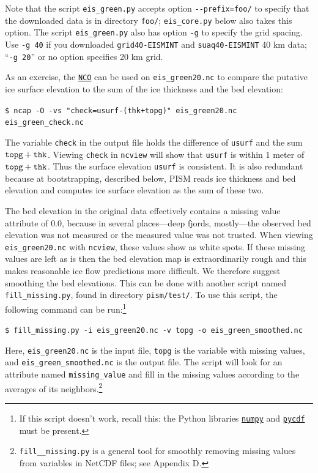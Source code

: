 \documentclass[11pt,final]{amsart}
\newcommand{\und}{\_\!\_}
\begin{document}
Note that the script \verb|eis_green.py| accepts option \verb|--prefix=foo/| to specify that the downloaded data is in directory \verb|foo/|; \verb|eis_core.py| below also takes this option.  The script \verb|eis_green.py| also has option \verb|-g| to specify the grid spacing.  Use \verb|-g 40| if you downloaded \verb|grid40-EISMINT| and \verb|suaq40-EISMINT| 40 km data; ``\verb|-g 20|'' or no option specifies 20 km grid.

As an exercise, the \href{http://nco.sourceforge.net/}{\texttt{NCO}} can be used on \verb|eis_green20.nc| to compare the putative ice surface elevation to the sum of the ice thickness and the bed elevation:

\verb|$ ncap -O -vs "check=usurf-(thk+topg)" eis_green20.nc eis_green_check.nc|

\noindent The variable \verb|check| in the output file holds the difference of \verb|usurf| and the sum $\verb|topg|+\verb|thk|$.  Viewing \verb|check| in \verb|ncview| will show that \verb|usurf| is within 1 meter of $\verb|topg|+\verb|thk|$.  Thus the surface elevation \verb|usurf| is consistent.  It is also redundant because at bootstrapping, described below, PISM reads ice thickness and bed elevation and computes ice surface elevation as the sum of these two.

The bed elevation in the original data effectively contains a missing value attribute of $0.0$, because in several places---deep fjords, mostly---the observed bed elevation was not measured or the measured value was not trusted.  When viewing \verb|eis_green20.nc| with \verb|ncview|, these values show as white spots.  If these missing values are left as is then the bed elevation map is extraordinarily rough and this makes reasonable ice flow predictions more difficult.  We therefore suggest smoothing the bed elevations.  This can be done with another script named \verb|fill_missing.py|, found in directory \verb|pism/test/|. To use this script, the following command can be run:\footnote{If this script doesn't work, recall this: the Python libraries \href{http://numpy.scipy.org/}{\texttt{numpy}} and \href{http://pysclint.sourceforge.net/pycdf/}{\texttt{pycdf}} must be present.}

\verb|$ fill_missing.py -i eis_green20.nc -v topg -o eis_green_smoothed.nc|

\noindent Here, \verb|eis_green20.nc| is the input file, \verb|topg| is the variable with missing values, and \verb|eis_green_smoothed.nc| is the output file. The script will look for an attribute named \verb|missing_value| and fill in the missing values according to the averages of its neighbors.\footnote{\texttt{fill\und missing.py} is a general tool for smoothly removing missing values from variables in NetCDF files; see Appendix D.}
\end{document}
